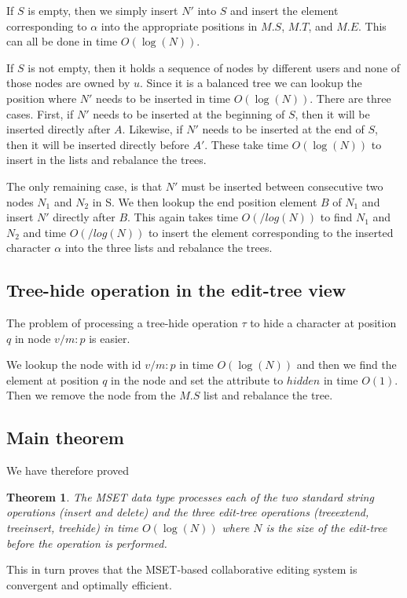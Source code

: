 \documentclass{amsart}
\newtheorem{theorem}{Theorem}[section]
\begin{document}
If $S$ is empty, then we simply insert $N'$ into $S$ and insert the element
corresponding to $\alpha$ into the appropriate positions in $M.S$, $M.T$, and $M.E$. This can all be done in time $O(\log(N))$.

If $S$ is not empty, then it holds a sequence of nodes by different users and none of those nodes are owned by $u$.  Since it is a balanced tree we can lookup the position where $N'$ needs to be inserted in time $O(\log(N))$. There are three
cases. First, if $N'$ needs to be inserted at the beginning of $S$, then 
it will be inserted directly after $A$. Likewise, if $N'$ needs to be inserted at the
end of $S$, then it will be inserted directly before $A'$.  These take time $O(\log(N))$ to insert in the lists and rebalance the trees.

The only remaining case, is that $N'$ must be inserted between consecutive two nodes $N_1$
and $N_2$ in S. We then lookup the end position element $B$ of $N_1$ and insert $N'$ directly after $B$. This again takes time $O(/log(N))$ to find $N_1$ and $N_2$
and time $O(/log(N))$ to insert the element corresponding to the inserted character $\alpha$ into the three lists and rebalance the trees. 


\subsection{Tree-hide operation in the edit-tree view}
The problem of processing a tree-hide operation $\tau$ to hide 
a character at position $q$ in node $v/m:p$ is easier.

We lookup the node with id $v/m:p$ in time $O(\log(N))$ and
then we find the element at position $q$ in the node
and set the attribute to $hidden$ in time $O(1)$. Then we remove the
node from the $M.S$ list and rebalance the tree.

\subsection{Main theorem}
We have therefore proved 

\begin{theorem}
The MSET data type processes each of the two standard string operations (insert and delete) and
the three edit-tree operations (treeextend, treeinsert, treehide) in time $O(\log(N))$ where $N$ is the size of the edit-tree before the operation is performed.
\end{theorem}

This in turn proves that the MSET-based collaborative editing system is convergent and optimally efficient.
\end{document}
